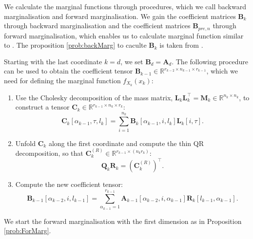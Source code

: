 We calculate the marginal functions through procedures, which we call backward marginalisation \cite{cui2022deep} and forward marginalisation.
We gain the coefficient matrices $\bm{B}_k$ through backward marginalisation and the coefficient matrices $\bm{B}_{pre,n}$ through forward marginalisation, which enables us to calculate marginal function similar to \cite{cui2022deep}.
The proposition \ref{prob:backMarg} to caculte $\bm{B}_k$  is taken from \cite{cui2022deep}.
\begin{prop}
	\label{prob:backMarg}
	Starting with the last coordinate $k = d$, we set $\bm{B}_d = \bm{A}_d$. The following procedure can be used to obtain the coefficient tensor $\bm{B}_{k-1} \in \mathbb{R}^{r_{k-2} \times n_{k-1} \times r_{k-1}}$, which we need for defining the marginal function $f_{X_k}(x_k)$:
	\begin{enumerate}
		\item Use the Cholesky decomposition of the mass matrix, $\bm{L}_k \bm{L}_k^\top = \bm{M}_k \in \mathbb{R}^{n_k \times n_k}$, to construct a tensor $\bm{C}_k \in \mathbb{R}^{r_{k-1} \times n_k \times r_k}$:
		\begin{equation}
			\bm{C}_k[\alpha_{k-1}, \tau, l_k] = \sum_{i=1}^{n_k} \bm{B}_k[\alpha_{k-1}, i, l_k] \bm{L}_k[i, \tau].
		\end{equation}
		\item Unfold $\bm{C}_k$ along the first coordinate and compute the thin QR decomposition, so that $\bm{C}_k^{(R)} \in \mathbb{R}^{r_{k-1} \times (n_k r_k)}$:
		\begin{equation}
			\bm{Q}_k \bm{R}_k = {(\bm{C}_k^{(R)})}^{\top}.
		\end{equation}
		\item Compute the new coefficient tensor:
		\begin{equation}
			\bm{B}_{k-1}[\alpha_{k-2}, i, l_{k-1}] = \sum_{\alpha_{k-1}=1}^{r_{k-1}} \bm{A}_{k-1}[\alpha_{k-2}, i, \alpha_{k-1}] \bm{R}_k[l_{k-1}, \alpha_{k-1}].
		\end{equation}
	\end{enumerate}
\end{prop}
We start the forward marginalisation with the first dimension as in Proposition \ref{prob:ForMarg}.
